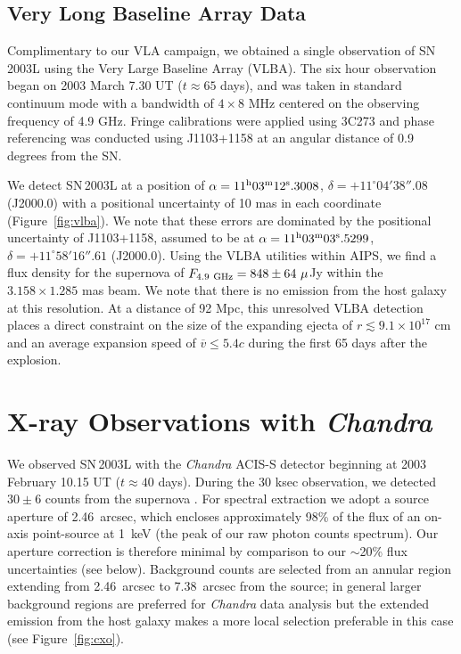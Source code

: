 \documentclass[12pt,preprint]{aastex}
\begin{document}
\subsection{Very Long Baseline Array Data}
\label{sec:vlba}
Complimentary to our VLA campaign, we obtained a single observation of
SN\,2003L using the Very Large Baseline Array (VLBA).  The six hour
observation began on 2003 March 7.30 UT ($t\approx 65$ days), and was
taken in standard continuum mode with a bandwidth of $4\times 8$ MHz
centered on the observing frequency of 4.9 GHz.  Fringe calibrations
were applied using 3C273 and phase referencing was conducted
using J1103+1158 at an angular distance of 0.9 degrees from the SN.

We detect SN\,2003L at a position of $\alpha=11^{\rm h} 03^{\rm m}
12^{\rm s}.3008$, $\delta=+11^{\circ} 04' 38''.08$ (J2000.0) with a
positional uncertainty of 10 mas in each coordinate
(Figure~\ref{fig:vlba}).  We note that these errors are dominated by
the positional uncertainty of J1103+1158, assumed to be at
$\alpha=11^{\rm h} 03^{\rm m} 03^{\rm s}.5299$, $\delta=+11^{\circ}
58' 16''.61$ (J2000.0).  Using the VLBA utilities within AIPS, we find
a flux density for the supernova of $F_{4.9\rm~GHz}=848 \pm 64~\mu$Jy
within the $3.158\times 1.285$ mas beam. We note that there is no
emission from the host galaxy at this resolution.  At a distance of 92
Mpc, this unresolved VLBA detection places a direct constraint on the
size of the expanding ejecta of $r\lesssim 9.1\times 10^{17}$ cm and
an average expansion speed of $\overline{v} \le 5.4c$ during the first
65 days after the explosion.

\section{X-ray Observations with \it Chandra\rm}
\label{sec:xray}

We observed SN\,2003L with the {\it Chandra} ACIS-S detector beginning
at 2003 February 10.15 UT ($t\approx 40$ days).  During the 30 ksec
observation, we detected $30\pm 6$ counts from the supernova
\citep{kf03}.  For spectral extraction we adopt a source aperture of
2.46~arcsec, which encloses approximately 98\% of the flux of an
on-axis point-source at 1~keV (the peak of our raw photon counts
spectrum).  Our aperture correction is therefore minimal by comparison
to our $\sim$20\% flux uncertainties (see below).  Background
counts are selected from an annular region extending from 2.46~arcsec
to 7.38~arcsec from the source; in general larger background regions
are preferred for {\it Chandra} data analysis but the extended
emission from the host galaxy makes a more local selection preferable
in this case (see Figure~\ref{fig:cxo}).
\end{document}
